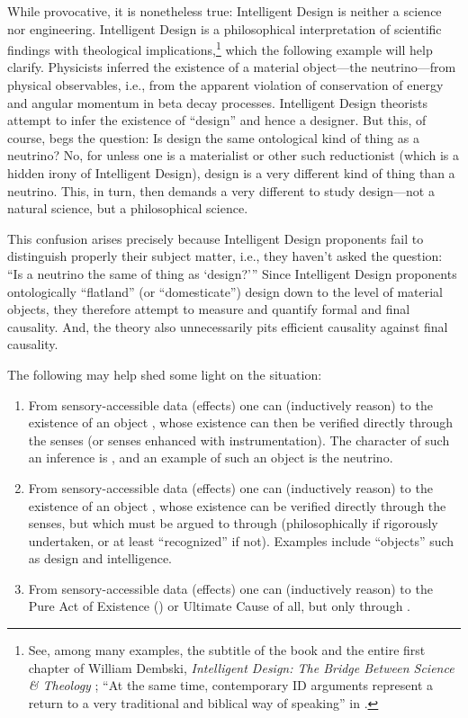 While provocative, it is nonetheless true: Intelligent Design is neither a science nor engineering. 
Intelligent Design is a philosophical interpretation of scientific findings with theological implications,\footnote{%
See, among many examples, the subtitle of the book and the entire first chapter of William Dembski, \textit{Intelligent Design: The Bridge Between Science \& Theology} \citeyearpar[][pp.~25--48]{dembski2002}; “At the same time, contemporary ID arguments represent a return to a very traditional and biblical way of speaking” in \citet[][p.~250]{richards2010b}.
}
which the following example will help clarify.
Physicists inferred the existence of a material object---the neutrino---from physical observables, i.e., from the apparent violation of conservation of energy and angular momentum in beta decay processes. Intelligent Design theorists attempt to infer the existence of ``design'' and hence a designer. But this, of course, begs the question: Is design the same ontological kind of thing as a neutrino? No, for unless one is a materialist or other such reductionist (which is a hidden irony of Intelligent Design), design is a very different kind of thing than a neutrino.  This, in turn, then demands a very different  to study design---not a natural science, but a philosophical science.

This confusion arises precisely because Intelligent Design proponents fail to distinguish properly their subject matter, i.e., they haven't asked the question: ``Is a neutrino the same  of thing as `design?'{''} Since Intelligent Design proponents ontologically ``flatland'' (or ``domesticate'') design down to the level of material objects, they therefore attempt to measure and quantify formal and final causality. And, the theory also unnecessarily pits efficient causality against final causality.

The following may help shed some light on the situation:
\begin{enumerate}
\item From sensory-accessible data (effects) one can  (inductively reason) to the existence of an object , whose existence can then be verified directly through the senses (or senses enhanced with instrumentation). The character of such an inference is , and an example of such an object is the neutrino.
\item From sensory-accessible data (effects) one can  (inductively reason) to the existence of an object , whose existence can  be verified directly through the senses, but which must be argued to through  (philosophically if rigorously undertaken, or at least ``recognized'' if not). Examples include ``objects'' such as design and intelligence.
\item From sensory-accessible data (effects) one can  (inductively reason) to the Pure Act of Existence () or Ultimate Cause of all, but only through .
\end{enumerate}

